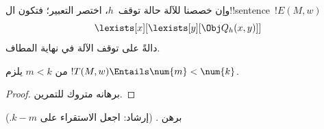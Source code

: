 \documentclass[../../../include/open-logic-section]{subfiles}
\begin{document}
وإن خصصنا للآلة حالة توقف~$h$، اختصر التعبير؛ فتكون
ال!!{sentence}~$!E(M,w)$
\[
\lexists[x][\lexists[y][\Obj Q_h(x, y)]]
\]
دالةً على توقف الآلة في نهاية المطاف.

\begin{prop}
من $m<k$ يلزم $!T(M,w)\Entails\num{m}<\num{k}$.
\end{prop}

\begin{proof}
برهانه متروك للتمرين.
\end{proof}

\begin{prob}
برهن .
(إرشاد: اجعل الاستقراء على $k-m$.)
\end{prob}
\end{document}
